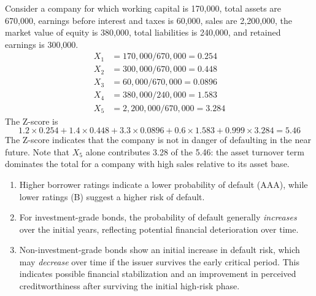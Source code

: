 \begin{crexbox}
Consider a company for which working capital is 170,000, total assets are
670,000, earnings before interest and taxes is 60,000, sales are 2,200,000, the
market value of equity is 380,000, total liabilities is 240,000, and retained
earnings is 300,000.
\tcblower
\begin{align*}
X_1 &= 170{,}000 / 670{,}000 = 0.254 \\
X_2 &= 300{,}000 / 670{,}000 = 0.448 \\
X_3 &= 60{,}000 / 670{,}000 = 0.0896 \\
X_4 &= 380{,}000 / 240{,}000 = 1.583 \\
X_5 &= 2{,}200{,}000 / 670{,}000 = 3.284
\end{align*}
The Z-score is
\[ 1.2 \times 0.254 + 1.4 \times 0.448 + 3.3 \times 0.0896 + 0.6 \times 1.583
   + 0.999 \times 3.284 = 5.46 \]
The Z-score indicates that the company is not in danger of defaulting in the near
future. Note that $X_5$ alone contributes 3.28 of the 5.46: the asset turnover
term dominates the total for a company with high sales relative to its asset
base.
\end{crexbox}


\begin{enumerate}
\item {} Higher borrower ratings indicate a lower
probability of default (AAA), while lower ratings (B) suggest a higher risk of
default.
\item {} For investment-grade bonds, the
probability of default generally \emph{increases} over the initial years,
reflecting potential financial deterioration over time.
\item {} Non-investment-grade bonds show an
initial increase in default risk, which may \emph{decrease} over time if the
issuer survives the early critical period. This indicates possible financial
stabilization and an improvement in perceived creditworthiness after surviving
the initial high-risk phase.
\end{enumerate}



